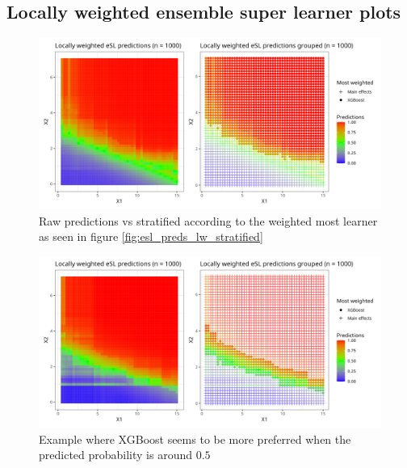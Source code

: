 \documentclass[11pt, a4paper]{article}
\theoremstyle{definition}
\theoremstyle{remark}
\begin{document}
\subsection{Locally weighted ensemble super learner plots}
\begin{figure}[H]
    \centering
    \centerline{\includegraphics[width=1.2\textwidth]{figures/esl_preds_lw_stratified_tiled.png}}
    \caption{Raw predictions vs stratified according to the weighted most learner as seen in figure \ref{fig:esl_preds_lw_stratified}}
    \label{fig:esl_preds_lw_stratified_tiled}
\end{figure}
 
\begin{figure}[H]
    \centering
    \centerline{\includegraphics[width=1.2\textwidth]{figures/esl_preds_lw_stratified_tiled2.png}}
    \caption{Example where XGBoost seems to be more preferred when the predicted probability is around $ 0.5 $}
    \label{fig:esl_preds_lw_stratified_tiled2}
\end{figure}
\end{document}
